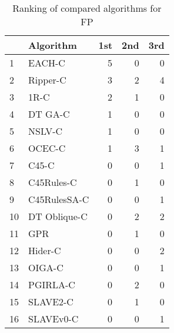 \begin{table}
\footnotesize
\caption{Ranking of compared algorithms for FP}
\label{tab:places FP}
\begin{tabular}{llrrr}
\hline
 & Algorithm & 1st & 2nd & 3rd \\
\hline
1 & EACH-C & 5 & 0 & 0 \\
2 & Ripper-C & 3 & 2 & 4 \\
3 & 1R-C & 2 & 1 & 0 \\
4 & DT GA-C & 1 & 0 & 0 \\
5 & NSLV-C & 1 & 0 & 0 \\
6 & OCEC-C & 1 & 3 & 1 \\
7 & C45-C & 0 & 0 & 1 \\
8 & C45Rules-C & 0 & 1 & 0 \\
9 & C45RulesSA-C & 0 & 0 & 1 \\
10 & DT Oblique-C & 0 & 2 & 2 \\
11 & GPR & 0 & 1 & 0 \\
12 & Hider-C & 0 & 0 & 2 \\
13 & OIGA-C & 0 & 0 & 1 \\
14 & PGIRLA-C & 0 & 2 & 0 \\
15 & SLAVE2-C & 0 & 1 & 0 \\
16 & SLAVEv0-C & 0 & 0 & 1 \\
\hline
\end{tabular}
\end{table}
